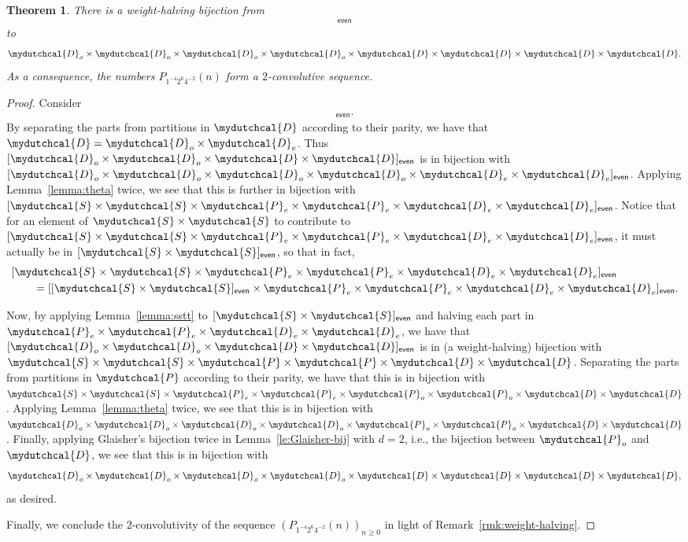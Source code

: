 \documentclass[12pt,reqno]{amsart}
\numberwithin{equation}{section}
\theoremstyle{plain}
\newtheorem{theorem}{Theorem}[section]
\theoremstyle{definition}
\theoremstyle{named}
\newcommand{\cP}{\mydutchcal{P}}
\newcommand{\cD}{\mydutchcal{D}}
\newcommand{\cS}{\mydutchcal{S}}
\newcommand{\even}{\mathsf{even}}
\begin{document}
\begin{theorem}\label{thm:A007096}
	There is a weight-halving bijection from
	\begin{align*}
		[\cD_{o} \times \cD_{o} \times \cD \times \cD]_\even
	\end{align*}
	to
	\begin{align*}
		\cD_{o} \times \cD_{o} \times \cD_{o} \times \cD_{o} \times \cD \times \cD \times \cD \times \cD.
	\end{align*}
	As a consequence, the numbers $P_{1^{-4} 2^6 4^{-2}}(n)$ form a $2$-convolutive sequence.
\end{theorem}

\begin{proof}
	Consider 
	\begin{align*}
		[\cD_{o} \times \cD_{o} \times \cD \times \cD]_\even.
	\end{align*}
	By separating the parts from partitions in $\cD$ according to their parity, we have that $\cD = \cD_o \times \cD_e$. Thus $[\cD_{o} \times \cD_{o} \times \cD \times \cD]_\even$ is in bijection with $[\cD_{o} \times \cD_{o} \times \cD_o \times \cD_o \times \cD_e \times \cD_e]_\even$. Applying Lemma~\ref{lemma:theta} twice, we see that this is further in bijection with $[\cS \times \cS \times \cP_e \times \cP_e \times \cD_{e} \times \cD_{e}]_\even$.
	Notice that for an element of $\cS \times \cS$ to contribute to $[\cS \times \cS \times \cP_e \times \cP_e \times \cD_{e} \times \cD_{e}]_\even$, it must actually be in $[\cS \times \cS]_\even$, so that in fact,
	\begin{align*}
		&[\cS \times \cS \times \cP_e \times \cP_e \times \cD_{e} \times \cD_{e}]_\even\\
		&\qquad = [[\cS \times \cS]_\even \times \cP_e \times \cP_e \times \cD_{e} \times \cD_{e}]_\even.
	\end{align*}
	
	Now, by applying Lemma~\ref{lemma:sstt} to $[\cS \times \cS]_\even$ and halving each part in $\cP_e \times \cP_e \times \cD_{e} \times \cD_{e}$, we have that $[\cD_{o} \times \cD_{o} \times \cD \times \cD]_\even$ is in (a weight-halving) bijection with $\cS \times \cS \times \cP \times \cP \times \cD \times \cD$. Separating the parts from partitions in $\cP$ according to their parity, we have that this is in bijection with $\cS \times \cS \times \cP_e \times \cP_e \times \cP_o \times \cP_o \times \cD \times \cD$. Applying Lemma~\ref{lemma:theta} twice, we see that this is in bijection with $\cD_o \times \cD_o \times \cD_o \times \cD_o \times \cP_o \times \cP_o \times \cD \times \cD$. Finally, applying Glaisher's bijection twice in Lemma~\ref{le:Glaisher-bij} with $d=2$, i.e., the bijection between $\cP_o$ and $\cD$, we see that this is in bijection with
	\begin{align*}
		\cD_o \times \cD_o \times \cD_o \times \cD_o \times \cD \times \cD \times \cD \times \cD,
	\end{align*}
	as desired.
	
	Finally, we conclude the $2$-convolutivity of the sequence $(P_{1^{-4} 2^6 4^{-2}}(n))_{n\ge 0}$ in light of Remark~\ref{rmk:weight-halving}.
\end{proof}
\end{document}
